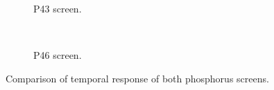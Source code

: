 \begin{figure}[!ht]
	\begin{subfigure}[t]{0.5\textwidth}
		
		\caption{P43 screen.}
		\label{}
	\end{subfigure}
	~
	\begin{subfigure}[t]{0.5\textwidth}
		
		\caption{P46 screen.}
		\label{}
	\end{subfigure}
	\caption[Comparison of temporal response of both phosphorus screens]{Comparison of temporal response of both phosphorus screens.}
	\label{chap4:P_timing}
\end{figure}